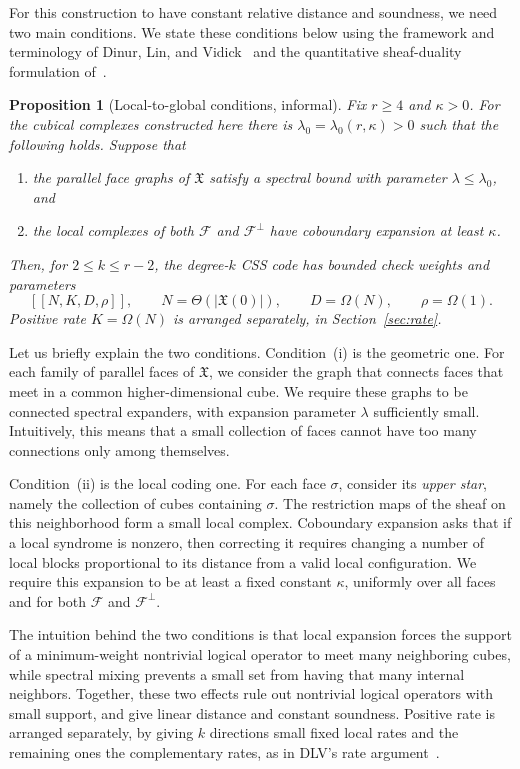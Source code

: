 \documentclass[11pt,letterpaper]{article}
\renewcommand{\le}{\leqslant}
\renewcommand{\ge}{\geqslant}
\newtheorem{proposition}[theorem]{Proposition}
\theoremstyle{definition}
\theoremstyle{remark}
\newcommand{\cF}{\mathcal F}
\newcommand{\X}{\mathfrak{X}}
\begin{document}
For this construction to have constant relative distance and soundness, we need two main conditions. We state these conditions below using the framework and terminology of Dinur, Lin, and Vidick~\cite{DinurLinVidick2024} and the quantitative sheaf-duality formulation of~\cite{LiEtAl2025}.

\begin{proposition}[Local-to-global conditions, informal]
\label{overview:criterion}
Fix $r\ge4$ and $\kappa>0$. For the cubical complexes constructed here
there is $\lambda_0=\lambda_0(r,\kappa)>0$ such that the following
holds. Suppose that
\begin{enumerate}[label=(\roman*),leftmargin=*]
\item the parallel face graphs of $\X$ satisfy a spectral bound with
parameter $\lambda\le\lambda_0$, and
\item the local complexes of both $\cF$ and $\cF^\perp$ have coboundary
expansion at least $\kappa$.
\end{enumerate}
Then, for $2\le k\le r-2$, the degree-$k$ CSS code has bounded check
weights and parameters
\[
 [[N,K,D,\rho]],\qquad N=\Theta(|\X(0)|),\qquad
 D=\Omega(N),\qquad \rho=\Omega(1).
\]
Positive rate $K=\Omega(N)$ is arranged separately, in
Section~\ref{sec:rate}.
\end{proposition}

Let us briefly explain the two conditions. Condition~(i) is the geometric one. For each family of parallel faces of $\X$, we consider the graph that connects faces that meet in a common higher-dimensional cube. We require these graphs to be connected spectral expanders, with expansion parameter $\lambda$ sufficiently small. Intuitively, this means that a small collection of faces cannot have too many connections only among themselves.

Condition~(ii) is the local coding one. For each face $\sigma$, consider its \emph{upper star}, namely the collection of cubes containing $\sigma$. The restriction maps of the sheaf on this neighborhood form a small local complex. Coboundary expansion asks that if a local syndrome is nonzero, then correcting it requires changing a number of local blocks proportional to its distance from a valid local configuration. We require this expansion to be at least a fixed constant $\kappa$, uniformly over all faces and for both $\cF$ and $\cF^\perp$.


The intuition behind the two conditions is that local expansion forces the support of a
minimum-weight nontrivial logical operator to meet many neighboring
cubes, while spectral mixing prevents a small set from having that many
internal neighbors. Together, these two effects rule out nontrivial
logical operators with small support, and give linear distance and
constant soundness. Positive rate is arranged
separately, by giving $k$ directions small fixed local rates and the
remaining ones the complementary rates, as in DLV's rate
argument~\cite[Section~4]{DinurLinVidick2024}.
\end{document}
